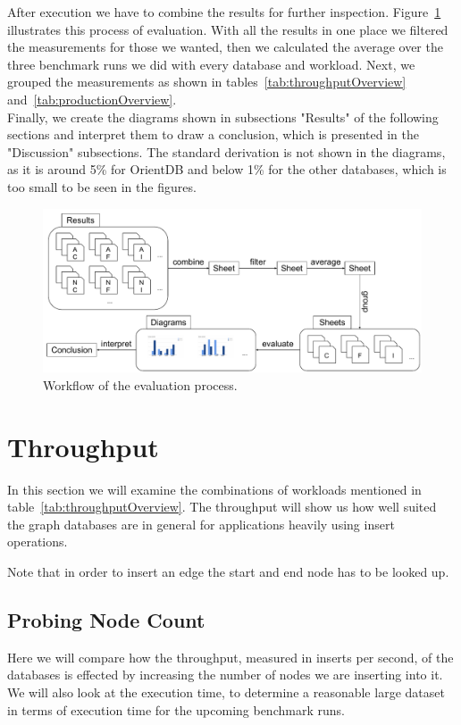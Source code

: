After execution we have to combine the results for further inspection.
Figure~\ref{fig:evaluationWorkflow} illustrates this process of evaluation.
With all the results in one place we filtered the measurements for those we wanted,
then we calculated the average over the three benchmark runs we did with every database and workload.
Next,
we grouped the measurements as shown in tables~\ref{tab:throughputOverview} and~\ref{tab:productionOverview}.\\

Finally,
we create the diagrams shown in subsections "Results" of the following sections and interpret them to draw a conclusion,
which is presented in the "Discussion" subsections.
The standard derivation is not shown in the diagrams,
as it is around 5\% for OrientDB and below 1\% for the other databases,
which is too small to be seen in the figures.

\begin{figure}[!h]
  \includegraphics[width=\textwidth]{images/evaluationProcess}
  \caption{Workflow of the evaluation process.}
  \label{fig:evaluationWorkflow}
\end{figure}

\section{Throughput}
\label{ch:evaluation:se:throughput}
In this section we will examine the combinations of workloads mentioned in table~\ref{tab:throughputOverview}.
The throughput will show us how well suited the graph databases are in general for applications heavily using insert operations.

Note that in order to insert an edge the start and end node has to be looked up.

\subsection{Probing Node Count}
\label{ch:evaluation:se:probingNodeCount}
Here we will compare how the throughput,
measured in inserts per second,
of the databases is effected by increasing the number of nodes we are inserting into it.
We will also look at the execution time,
to determine a reasonable large dataset in terms of execution time for the upcoming benchmark runs.

